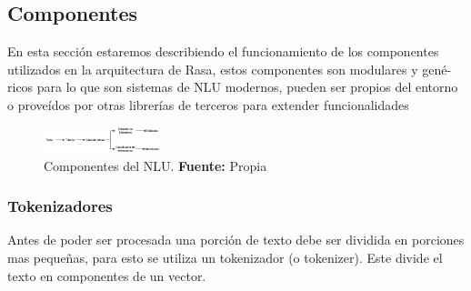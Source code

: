 \subsection{Componentes}
En esta sección estaremos describiendo el funcionamiento de los componentes
utilizados en la arquitectura de Rasa, estos componentes son modulares y gené-
ricos para lo que son sistemas de NLU modernos, pueden ser propios del entorno
o proveídos por otras librerías de terceros para extender funcionalidades
\begin{figure}[H]
\begin{centering}
\includegraphics[angle=0,width=0.3\textwidth]{Figuras/Componentes_NLU.png}
\par \end{centering}
\caption[Componentes del NLU]{Componentes del NLU. \textbf{Fuente:} Propia}
\label{Estructura}
\end{figure}
\subsubsection{Tokenizadores}
Antes de poder ser procesada una porción de texto debe ser dividida en porciones mas pequeñas, para esto se utiliza 
un tokenizador (o tokenizer).   Este divide el texto en componentes de un vector.
